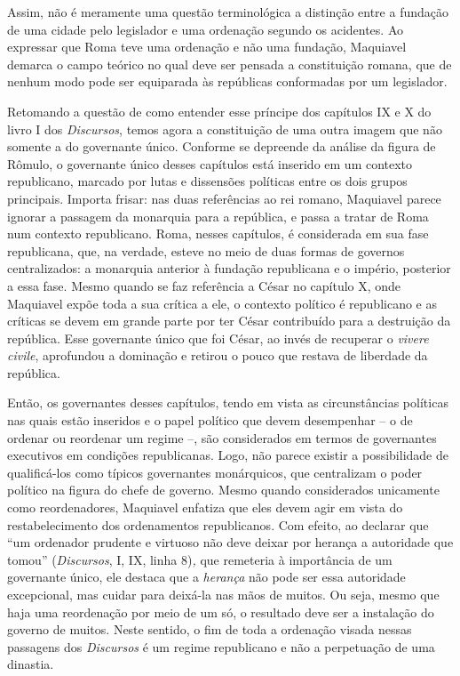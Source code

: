 Assim, não é meramente uma questão terminológica a distinção entre a
fundação de uma cidade pelo legislador e uma ordenação segundo os
acidentes. Ao expressar que Roma teve uma ordenação e não uma fundação,
Maquiavel demarca o campo teórico no qual deve ser pensada a
constituição romana, que de nenhum modo pode ser equiparada às
repúblicas conformadas por um legislador.

Retomando a questão de como entender esse príncipe dos capítulos IX e X
do livro I dos \emph{Discursos}, temos agora a constituição de uma outra
imagem que não somente a do governante único. Conforme se depreende da
análise da figura de Rômulo, o governante único desses capítulos está
inserido em um contexto republicano, marcado por lutas e dissensões
políticas entre os dois grupos principais. Importa frisar: nas duas
referências ao rei romano, Maquiavel parece ignorar a passagem da
monarquia para a república, e passa a tratar de Roma num contexto
republicano. Roma, nesses capítulos, é considerada em sua fase
republicana, que, na verdade, esteve no meio de duas formas de governos
centralizados: a monarquia anterior à fundação republicana e o império,
posterior a essa fase. Mesmo quando se faz referência a César no
capítulo X, onde Maquiavel expõe toda a sua crítica a ele, o contexto
político é republicano e as críticas se devem em grande parte por ter
César contribuído para a destruição da república. Esse governante único
que foi César, ao invés de recuperar o \emph{vivere civile}, aprofundou
a dominação e retirou o pouco que restava de liberdade da república.

Então, os governantes desses capítulos, tendo em vista as circunstâncias
políticas nas quais estão inseridos e o papel político que devem
desempenhar -- o de ordenar ou reordenar um regime --, são considerados
em termos de governantes executivos em condições republicanas. Logo, não
parece existir a possibilidade de qualificá-los como típicos governantes
monárquicos, que centralizam o poder político na figura do chefe de
governo. Mesmo quando considerados unicamente como reordenadores,
Maquiavel enfatiza que eles devem agir em vista do restabelecimento dos
ordenamentos republicanos. Com efeito, ao declarar que ``um ordenador
prudente e virtuoso não deve deixar por herança a autoridade que tomou''
(\emph{Discursos}, I, IX, linha 8)\emph{,} que remeteria à importância
de um governante único, ele destaca que a \emph{herança} não pode ser
essa autoridade excepcional, mas cuidar para deixá-la nas mãos de
muitos. Ou seja, mesmo que haja uma reordenação por meio de um só, o
resultado deve ser a instalação do governo de muitos. Neste sentido, o
fim de toda a ordenação visada nessas passagens dos \emph{Discursos} é
um regime republicano e não a perpetuação de uma dinastia.

